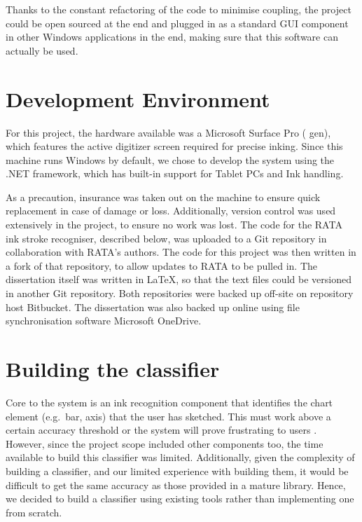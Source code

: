 	Thanks to the constant refactoring of the code to minimise coupling, the project could be open sourced at the end and plugged in as a standard GUI component in other Windows applications in the end, making sure that this software can actually be used.
	
	
	
	
	
	\section{Development Environment}
	For this project, the hardware available was a Microsoft Surface Pro ( gen), which features the active digitizer screen required for precise inking. Since this machine runs Windows by default, we chose to develop the system using the .NET framework, which has built-in support for Tablet PCs and Ink handling.
	
	As a precaution, insurance was taken out on the machine to ensure quick replacement in case of damage or loss. Additionally, version control was used extensively in the project, to ensure no work was lost. The code for the RATA ink stroke recogniser, described below, was uploaded to a Git repository in collaboration with RATA's authors. The code for this project was then written in a fork of that repository, to allow updates to RATA to be pulled in. The dissertation itself was written in \LaTeX , so that the text files could be versioned in another Git repository. Both repositories were backed up off-site on repository host Bitbucket. The dissertation was also backed up online using file synchronisation software Microsoft OneDrive. 
	
	\section{Building the classifier}	
	Core to the system is an ink recognition component that identifies the chart element (e.g.\ bar, axis) that the user has sketched. This must work above a certain accuracy threshold or the system will prove frustrating to users \citep{frankish_recognition_1995}. However, since the project scope included other components too, the time available to build this classifier was limited. Additionally, given the complexity of building a classifier, and our limited experience with building them, it would be difficult to get the same accuracy as those provided in a mature library. Hence, we decided to build a classifier using existing tools rather than implementing one from scratch. 
	
